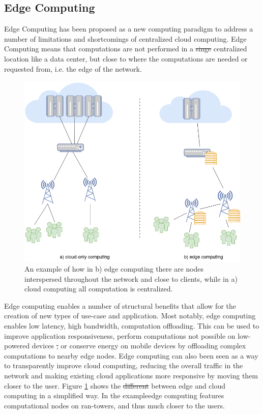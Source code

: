 \documentclass[draft,final]{vutinfth} %
\providecommand{\DIFaddtex}[1]{{\protect\color{blue}\uwave{#1}}} %
\providecommand{\DIFdeltex}[1]{{\protect\color{red}\sout{#1}}}                      %
\providecommand{\DIFaddbegin}{} %
\providecommand{\DIFaddend}{} %
\providecommand{\DIFdelbegin}{} %
\providecommand{\DIFdelend}{} %
\providecommand{\DIFadd}[1]{\texorpdfstring{\DIFaddtex{#1}}{#1}} %
\providecommand{\DIFdel}[1]{\texorpdfstring{\DIFdeltex{#1}}{}} %
\begin{document}
\subsection{Edge Computing}
Edge Computing has been proposed as a new computing paradigm to address a number of limitations and shortcomings of centralized cloud computing.
Edge Computing means that computations are not performed in a \DIFdelbegin \DIFdel{singe }\DIFdelend \DIFaddbegin \DIFadd{single }\DIFaddend centralized location like a data center, but close to where the computations are needed or requested from, i.e. the edge of the network\cite{shiPromiseEdgeComputing2016}.

\begin{figure}
    \centering
    \includegraphics[width=12cm]{graphics/diagrams/edge_computing_example.png}
    \caption{An example of how in b) edge computing there are nodes interspersed throughout the network and close to clients, while in a) cloud computing all computation is centralized.}
    \label{fig:edge_comp_example}
\end{figure}

Edge computing enables a number of structural benefits that allow for the creation of new types of use-case and application.
Most notably, edge computing enables low latency, high bandwidth, computation offloading.
This can be used to improve application responsiveness, perform computations not possible on low-powered devices \DIFdelbegin \DIFdel{, }\DIFdelend or conserve energy on mobile devices by offloading complex computations to nearby edge nodes\cite{abbasMobileEdgeComputing2018b}.
Edge computing can also been seen as a way to transparently improve cloud computing, reducing the overall traffic in the network and making existing cloud applications more responsive by moving them closer to the user\cite{satyanarayananEmergenceEdgeComputing2017}.
Figure \ref{fig:edge_comp_example} shows the \DIFdelbegin \DIFdel{different }\DIFdelend \DIFaddbegin \DIFadd{difference }\DIFaddend between edge and cloud computing in a simplified way.
In the example\DIFaddbegin \DIFadd{, }\DIFaddend edge computing features computational nodes on \gls{ran}-towers, and thus much closer to the users.
\end{document}
